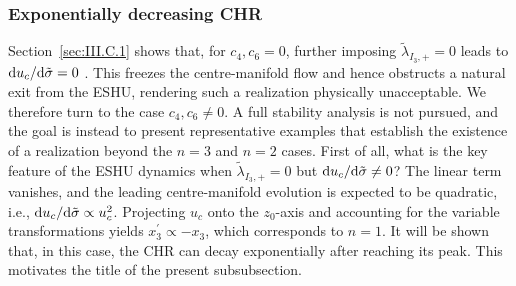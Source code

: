 \documentclass[aps,prd,twocolumn]{revtex4-2}
\newcommand\dx{{\rm d}}
\begin{document}
\subsubsection{Exponentially decreasing CHR}\label{sec:III.C.3}
Section~\ref{sec:III.C.1} shows that, for $c_4,c_6=0$, further imposing $\tilde{\lambda}_{I_3,+}=0$ leads to $\dx u_c/\dx\tilde{\sigma}=0$ \cite{FootnoteEq329}. This freezes the centre-manifold flow and hence obstructs a natural exit from the ESHU, rendering such a realization physically unacceptable. We therefore turn to the case $c_4,c_6\neq0$. A full stability analysis is not pursued, and the goal is instead to present representative examples that establish the existence of a realization beyond the $n=3$ and $n=2$ cases. First of all, what is the key feature of the ESHU dynamics when $\tilde{\lambda}_{I_3,+}=0$ but $\dx u_c/\dx\tilde{\sigma}\neq0$? The linear term vanishes, and the leading centre-manifold evolution is expected to be quadratic, i.e., $\dx u_c/\dx\tilde{\sigma}\propto u_c^2$. Projecting $u_c$ onto the $z_0$-axis and accounting for the variable transformations yields $x_3^\prime\propto-x_3$, which corresponds to $n=1$. It will be shown that, in this case, the CHR can decay exponentially after reaching its peak. This motivates the title of the present subsubsection.
\end{document}
